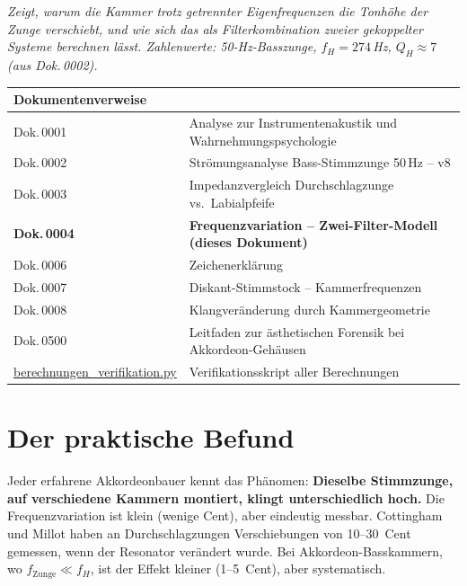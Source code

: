 \documentclass[11pt,a4paper]{article}
\begin{document}
\hbmaketitle

{\small\itshape Zeigt, warum die Kammer trotz getrennter Eigenfrequenzen die Tonhöhe der Zunge verschiebt, und wie sich das als Filterkombination zweier gekoppelter Systeme berechnen lässt. Zahlenwerte: 50-Hz-Basszunge, $f_H = 274$\,Hz, $Q_H \approx 7$ (aus Dok.\,0002).}

\vspace{2mm}
\begin{center}\small
\begin{tabularx}{\textwidth}{l X}
\hbtoprule
\textbf{Dokumentenverweise} \\
\midrule
Dok.\,0001 & Analyse zur Instrumentenakustik und Wahrnehmungspsychologie \\
Dok.\,0002 & Strömungsanalyse Bass-Stimmzunge 50\,Hz -- v8 \\
Dok.\,0003 & Impedanzvergleich Durchschlagzunge vs.\ Labialpfeife \\
\textbf{Dok.\,0004} & \textbf{Frequenzvariation -- Zwei-Filter-Modell (dieses Dokument)} \\
Dok.\,0006 & Zeichenerklärung \\
Dok.\,0007 & Diskant-Stimmstock -- Kammerfrequenzen \\
Dok.\,0008 & Klangveränderung durch Kammergeometrie \\
Dok.\,0500 & Leitfaden zur ästhetischen Forensik bei Akkordeon-Gehäusen \\
\midrule
\href{berechnungen_verifikation.py}{berechnungen\_verifikation.py} & Verifikationsskript aller Berechnungen \\
\bottomrule
\end{tabularx}
\end{center}

\vspace{4mm}

\section{Der praktische Befund}

Jeder erfahrene Akkordeonbauer kennt das Phänomen: \textbf{Dieselbe Stimmzunge, auf verschiedene Kammern montiert, klingt unterschiedlich hoch.} Die Frequenzvariation ist klein (wenige Cent), aber eindeutig messbar. Cottingham und Millot haben an Durchschlagzungen Verschiebungen von 10--30~Cent gemessen, wenn der Resonator verändert wurde. Bei Akkordeon-Basskammern, wo $f_\text{Zunge} \ll f_H$, ist der Effekt kleiner (1--5~Cent), aber systematisch.
\end{document}
